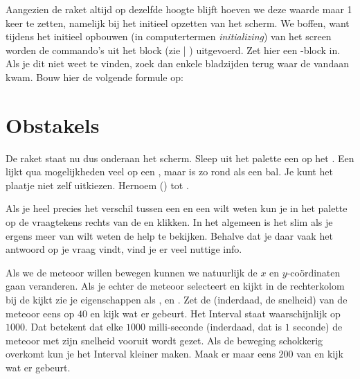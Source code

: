 Aangezien de raket altijd op dezelfde hoogte blijft hoeven we deze waarde maar 1 keer te zetten, namelijk bij het initieel opzetten van het scherm. We boffen, want tijdens het initieel opbouwen (in computertermen \emph{initializing}) van het screen worden de commando's uit het block  (zie  | ) uitgevoerd. Zet hier een 
\linebreak {}-block in. Als je dit niet weet te vinden, zoek dan enkele bladzijden terug waar de 
\linebreak {} vandaan kwam. 
Bouw hier de volgende formule op:

\runOpTelefoon{} 


\section{Obstakels}
De raket staat nu dus onderaan het scherm. Sleep uit het palette  een  op het . Een  lijkt qua mogelijkheden veel op een 
\linebreak {}, maar is zo rond als een bal. 
Je kunt het plaatje niet zelf uitkiezen. Hernoem ()  tot .

Als je heel precies het verschil tussen een  en een  wilt weten kun je in het palette op de vraagtekens rechts van de  en  klikken.
In het algemeen is het slim als je ergens meer van wilt weten de help te bekijken. Behalve dat je daar vaak het antwoord op je vraag vindt, vind je er veel nuttige info. 

Als we de meteoor willen bewegen kunnen we natuurlijk de $x$ en $y$-co\"ordinaten gaan veranderen. Als je echter de meteoor selecteert en kijkt in de rechterkolom bij de  kijkt zie je eigenschappen als ,  en . Zet de  (inderdaad, de snelheid) van de meteoor eens op $40$ en kijk wat er gebeurt. 
\runOpTelefoon{}
Het Interval staat waarschijnlijk op $1000$. Dat betekent dat elke $1000$ milli-seconde (inderdaad, dat is $1$ seconde) de meteoor met zijn snelheid vooruit wordt gezet. Als de beweging schokkerig overkomt kun je het Interval kleiner maken. Maak er maar eens $200$ van en kijk wat er gebeurt. 
\runOpTelefoon{}

